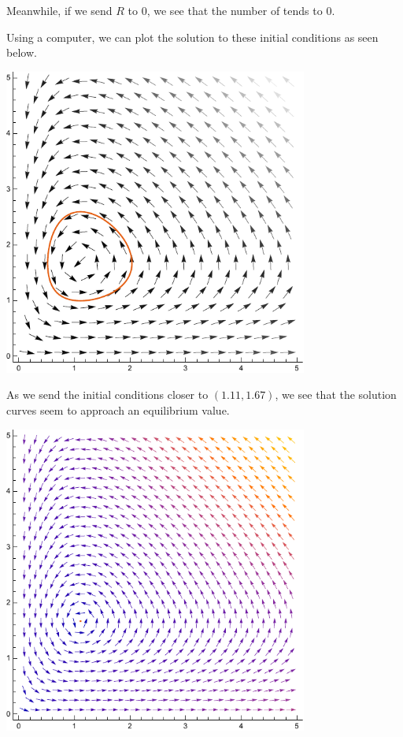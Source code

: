 \documentclass[10pt]{mypackage}
\begin{document}
\begin{example}
Meanwhile, if we send $R$ to $0$, we see that the number of tends to $0$.\newline

Using a computer, we can plot the solution to these initial conditions as seen below.
\begin{center}
  \includegraphics[width=10cm]{images/lv_eqns_w_sol.pdf}
\end{center}
As we send the initial conditions closer to $(1.11,1.67)$, we see that the solution curves seem to approach an equilibrium value.
\begin{center}
  \includegraphics[width=10cm]{images/lv_eqns_w_sol_2.pdf}
\end{center}
\end{example}
\end{document}
